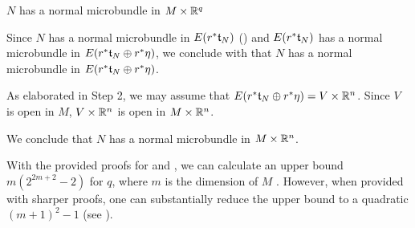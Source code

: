 \begin{scope}
\begin{myproof}
\begin{steps}
\item $N$ has a normal microbundle in $M \times \mathbb{R}^q$

Since $N$ has a normal microbundle in $E(r^*\mathfrak{t}_N)$ () and $E(r^*\mathfrak{t}_N)$ has a normal microbundle in $E(r^*\mathfrak{t}_N \oplus{} r^*\eta)$, we conclude with  that $N$ has a normal microbundle in $E(r^*\mathfrak{t}_N \oplus{} r^*\eta)$.

As elaborated in Step 2, we may assume that $E(r^*\mathfrak{t}_N \oplus{} r^*\eta) = V \times \mathbb{R}^n$. Since $V$ is open in $M$, $V \times \mathbb{R}^n$ is open in $M \times \mathbb{R}^n$. \end{steps} We conclude that $N$ has a normal microbundle in $M \times \mathbb{R}^n$. \end{myproof}

\begin{myparagraph} With the provided proofs for  and , we can calculate an upper bound $m(2^{2m + 2} - 2)$ for $q$, where $m$ is the dimension of $M$ \cite[p.63]{milnor}. However, when provided with sharper proofs, one can substantially reduce the upper bound to a quadratic $(m + 1)^2 - 1$ (see \cite[p.232]{hirsch}). \end{myparagraph} \end{scope}